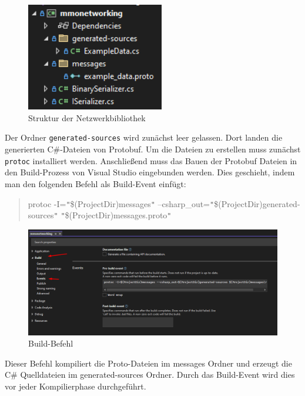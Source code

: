 \begin{figure}[!h]
	\centering
	\includegraphics[width=6cm]{figures/networkingstructure.png}
	\caption{Struktur der Netzwerkbibliothek}
	\label{fig:networkingstructure}
\end{figure}

Der Ordner \verb|generated-sources| wird zunächst leer gelassen. Dort landen die generierten C\#-Dateien von Protobuf. Um die Dateien zu erstellen muss zunächst \verb|protoc| installiert werden. Anschließend muss das Bauen der Protobuf Dateien in den Build-Prozess von Visual Studio eingebunden werden. Dies geschieht, indem man den folgenden Befehl als Build-Event einfügt:

\begin{quote}
	\centering
	protoc -I=\verb|"|\$(ProjectDir)messages\verb|"| --csharp\_out=\verb|"|\$(ProjectDir)generated-sources\verb|"| \verb|"|\$(ProjectDir)messages\*.proto\verb|"|
\end{quote}

\begin{figure}[!h]
	\centering
	\includegraphics[width=16cm]{figures/networkingprotobuild.png}
	\caption{Build-Befehl}
	\label{fig:networkingbuildcommand}
\end{figure}

Dieser Befehl kompiliert die Proto-Dateien im messages Ordner und erzeugt die C\# Quelldateien im generated-sources Ordner. Durch das Build-Event wird dies vor jeder Kompilierphase durchgeführt.

